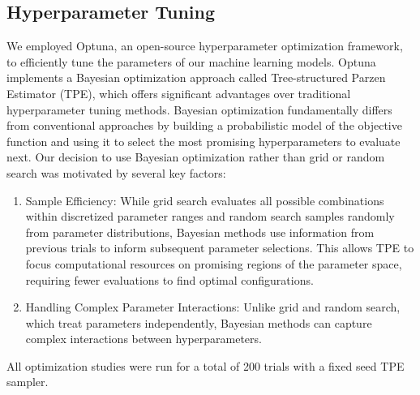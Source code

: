 \documentclass[12pt,twoside]{report}
\begin{document}
\subsection{Hyperparameter Tuning}

We employed Optuna, an open-source hyperparameter optimization framework, to efficiently tune the parameters of our machine learning models. Optuna implements a Bayesian optimization approach called Tree-structured Parzen Estimator (TPE), which offers significant advantages over traditional hyperparameter tuning methods. Bayesian optimization fundamentally differs from conventional approaches by building a probabilistic model of the objective function and using it to select the most promising hyperparameters to evaluate next. Our decision to use Bayesian optimization rather than grid or random search was motivated by several key factors:
\begin{enumerate}
    \item Sample Efficiency: While grid search evaluates all possible combinations within discretized parameter ranges and random search samples randomly from parameter distributions, Bayesian methods use information from previous trials to inform subsequent parameter selections. This allows TPE to focus computational resources on promising regions of the parameter space, requiring fewer evaluations to find optimal configurations.

    \item Handling Complex Parameter Interactions: Unlike grid and random search, which treat parameters independently, Bayesian methods can capture complex interactions between hyperparameters.
\end{enumerate}
All optimization studies were run for a total of 200 trials with a fixed seed TPE sampler.
\end{document}

